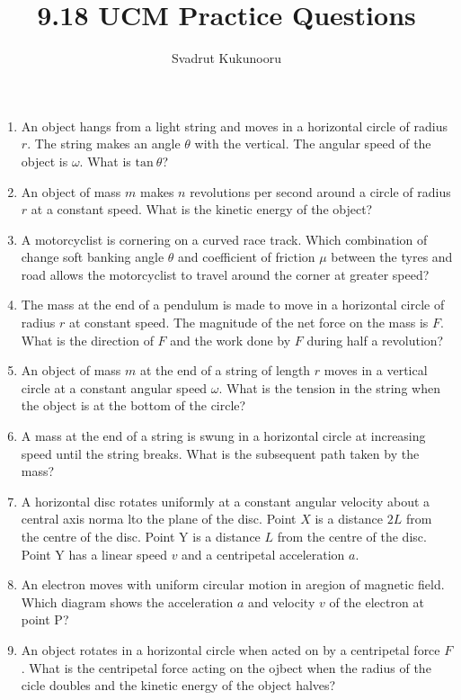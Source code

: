 \documentclass[a4paper]{report}
\title{9.18 UCM Practice Questions}
\author{Svadrut Kukunooru}
\begin{document}
    \maketitle
    \begin{enumerate}
        \item An object hangs from a light string and moves in a horizontal circle of radius $r$. The string makes an angle $\theta$ with the vertical. The angular speed of the object is $\omega$. What is $\text{tan}\ \theta$? 
        \item An object of mass $m$ makes $n$ revolutions per second around a circle of radius $r$ at a constant speed. What is the kinetic energy of the object? 
        \item A motorcyclist is cornering on a curved race track. Which combination of change soft banking angle $\theta$ and coefficient of friction $\mu$ between the tyres and road allows the motorcyclist to travel around the corner at greater speed? 
        \item The mass at the end of a pendulum is made to move in a horizontal circle of radius $r$ at constant speed. The magnitude of the net force on the mass is $F$. What is the direction of $F$ and the work done by $F$ during half a revolution? 
        \item An object of mass $m$ at the end of a string of length $r$ moves in a vertical circle at a constant angular speed $\omega$. What is the tension in the string when the object is at the bottom of the circle? 
        \item A mass at the end of a string is swung in a horizontal circle at increasing speed until the string breaks. What is the subsequent path taken by the mass? 
        \item A horizontal disc rotates uniformly at a constant angular velocity about a central axis norma lto the plane of the disc. Point $X$ is a distance $2L$ from the centre of the disc. Point Y is a distance $L$ from the centre of the disc. Point Y has a linear speed $v$ and a centripetal acceleration $a$. 
        \item An electron moves with uniform circular motion in aregion of magnetic field. Which diagram shows the acceleration $a$ and velocity $v$ of the electron at point P? 
        \item An object rotates in a horizontal circle when acted on by a centripetal force $F$. What is the centripetal force acting on the ojbect when the radius of the cicle doubles and the kinetic energy of the object halves? 

\end{enumerate}
\end{document}

